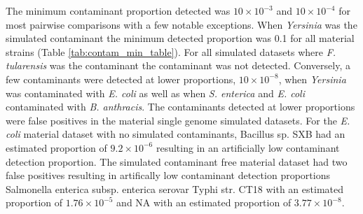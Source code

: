 \documentclass[fleqn,10pt,lineno]{wlpeerj}\usepackage[]{graphicx}\usepackage[]{color}
\begin{document}
\begin{table}[ht]
\centering
{}
\caption{Lowest proportion of contaminant in each pairwise combination of representative genomes detected.} 
\label{tab:contam_min_table}
\end{table}



The minimum contaminant proportion detected was $10 \times 10^{-3}$ and  $10 \times 10^{-4}$ for most pairwise comparisons with a few notable exceptions. 
When \textit{Yersinia} was the simulated contaminant the minimum detected proportion was 0.1 for all material strains (Table \ref{tab:contam_min_table}). 
For all simulated datasets where \textit{F. tularensis} was the contaminant the contaminant was not detected.
Conversely, a few contaminants were detected at lower proportions, $10 \times 10^{-8}$, when \textit{Yersinia} was contaminated with \textit{E. coli} as well as when \textit{S. enterica} and \textit{E. coli} contaminated with \textit{B. anthracis}. 
The contaminants detected at lower proportions were false positives in the material single genome simulated datasets. 
For the \textit{E. coli} material dataset with no simulated contaminants, Bacillus sp. SXB had an estimated proportion of \ensuremath{9.2\times 10^{-6}} resulting in an artificially low contaminant detection proportion. 
The simulated contaminant free  material dataset had two false positives resulting in artifically low contaminant detection proportions Salmonella enterica subsp. enterica serovar Typhi str. CT18 with an estimated proportion of \ensuremath{1.76\times 10^{-5}} and NA with an estimated proportion of \ensuremath{3.77\times 10^{-8}}.
\end{document}
